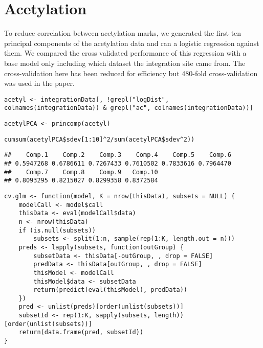 \documentclass[../../sherrill-Mix_thesis.tex]{subfiles}
\makeatletter
\newenvironment{kframe}{%
 \def\at@end@of@kframe{}%
 \ifinner\ifhmode%
  \def\at@end@of@kframe{\end{minipage}}%
  \begin{minipage}{\columnwidth}%
 \fi\fi%
 \def\FrameCommand##1{\hskip\@totalleftmargin \hskip-\fboxsep
 \colorbox{shadecolor}{##1}\hskip-\fboxsep
     \hskip-\linewidth \hskip-\@totalleftmargin \hskip\columnwidth}%
 \MakeFramed {\advance\hsize-\width
   \@totalleftmargin\z@ \linewidth\hsize
   \@setminipage}}%
 {\par\unskip\endMakeFramed%
 \at@end@of@kframe}
\newenvironment{knitrout}{}{} %
\makeatother
\begin{document}
\section{Acetylation}
To reduce correlation between acetylation marks, we generated the first ten principal components of the acetylation data and ran a logistic regression against them. We compared the cross validated performance of this regression with a base model only including which dataset the integration site came from. The cross-validation here has been reduced for efficiency but 480-fold cross-validation was used in the paper.
\begin{knitrout}
\color{fgcolor}\begin{kframe}
\begin{lstlisting}[basicstyle=\ttfamily,breaklines=true]
acetyl <- integrationData[, !grepl("logDist", colnames(integrationData)) & grepl("ac", colnames(integrationData))]\end{lstlisting}
\begin{lstlisting}[basicstyle=\ttfamily,breaklines=true]
acetylPCA <- princomp(acetyl)\end{lstlisting}
\begin{lstlisting}[basicstyle=\ttfamily,breaklines=true]
cumsum(acetylPCA$sdev[1:10]^2/sum(acetylPCA$sdev^2))\end{lstlisting}
\begin{lstlisting}[basicstyle=\ttfamily,breaklines=true]
##    Comp.1    Comp.2    Comp.3    Comp.4    Comp.5    Comp.6 
## 0.5947268 0.6786611 0.7267433 0.7610502 0.7833616 0.7964470 
##    Comp.7    Comp.8    Comp.9   Comp.10 
## 0.8093295 0.8215027 0.8299358 0.8372584
\end{lstlisting}
\begin{lstlisting}[basicstyle=\ttfamily,breaklines=true]
cv.glm <- function(model, K = nrow(thisData), subsets = NULL) {
    modelCall <- model$call
    thisData <- eval(modelCall$data)
    n <- nrow(thisData)
    if (is.null(subsets)) 
        subsets <- split(1:n, sample(rep(1:K, length.out = n)))
    preds <- lapply(subsets, function(outGroup) {
        subsetData <- thisData[-outGroup, , drop = FALSE]
        predData <- thisData[outGroup, , drop = FALSE]
        thisModel <- modelCall
        thisModel$data <- subsetData
        return(predict(eval(thisModel), predData))
    })
    pred <- unlist(preds)[order(unlist(subsets))]
    subsetId <- rep(1:K, sapply(subsets, length))[order(unlist(subsets))]
    return(data.frame(pred, subsetId))
}\end{lstlisting}

\end{kframe}
\end{knitrout}
\end{document}
